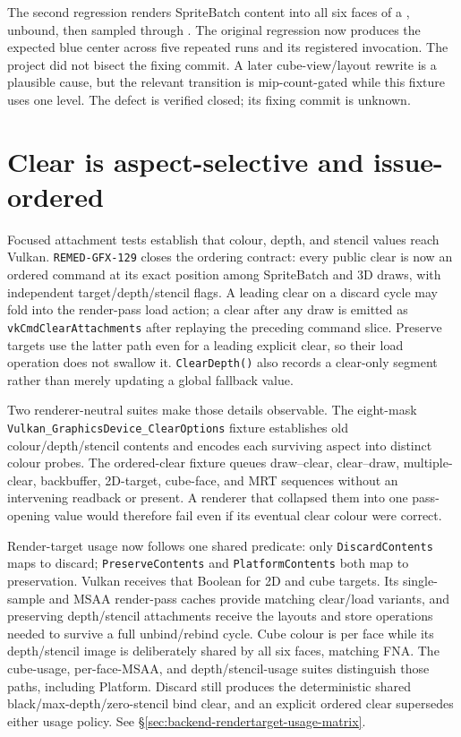 The second regression renders SpriteBatch content into all six faces of a
, unbound, then sampled through .
The original regression now produces the expected blue center across five repeated runs and its
registered invocation. The project did not bisect the fixing commit. A later cube-view/layout
rewrite is a plausible cause, but the relevant transition is mip-count-gated while this fixture
uses one level. The defect is verified closed; its fixing commit is unknown.

\section{Clear is aspect-selective and issue-ordered}

Focused attachment tests establish that colour, depth, and stencil values reach Vulkan.
\texttt{REMED-GFX-129} closes the ordering contract: every public
clear is now an ordered command at its exact position among SpriteBatch and 3D draws, with
independent target/depth/stencil flags. A leading clear on a discard cycle may fold into the
render-pass load action; a clear after any draw is emitted as \texttt{vkCmdClearAttachments}
after replaying the preceding command slice. Preserve targets use the latter path even for a
leading explicit clear, so their load operation does not swallow it. \texttt{ClearDepth()}
also records a clear-only segment rather than merely updating a global fallback value.

Two renderer-neutral suites make those details observable. The eight-mask
\texttt{Vulkan\_\allowbreak{}GraphicsDevice\_\allowbreak{}ClearOptions} fixture establishes old colour/depth/stencil
contents and encodes each surviving aspect into distinct colour probes. The ordered-clear
fixture queues draw--clear, clear--draw, multiple-clear, backbuffer, 2D-target, cube-face, and
MRT sequences without an intervening readback or present. A renderer that collapsed them into
one pass-opening value would therefore fail even if its eventual clear colour were correct.

Render-target usage now follows one shared predicate: only \texttt{DiscardContents} maps to
discard; \texttt{PreserveContents} and \texttt{PlatformContents} both map to preservation.
Vulkan receives that Boolean for 2D and cube targets. Its single-sample and MSAA render-pass
caches provide matching clear/load variants, and preserving depth/stencil attachments receive
the layouts and store operations needed to survive a full unbind/rebind cycle. Cube colour is
per face while its depth/stencil image is deliberately shared by all six faces, matching FNA.
The cube-usage, per-face-MSAA, and depth/stencil-usage suites distinguish those paths, including
Platform. Discard still produces the deterministic shared black/max-depth/zero-stencil bind
clear, and an explicit ordered clear supersedes either usage policy. See
\S\ref{sec:backend-rendertarget-usage-matrix}.

